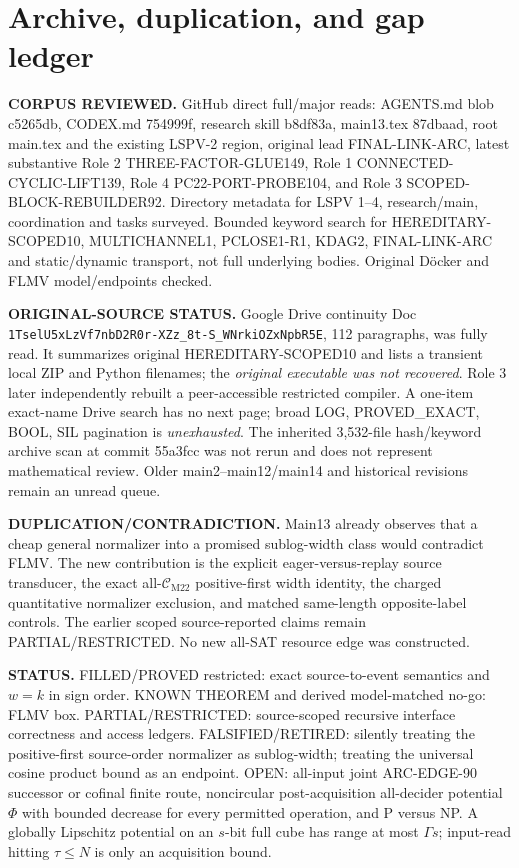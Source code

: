 \documentclass[11pt]{article}
\newcommand{\CM}{\mathcal C_{\mathrm{M22}}}
\begin{document}
\section{Archive, duplication, and gap ledger}
\noindent\textbf{CORPUS REVIEWED.} GitHub direct full/major reads: AGENTS.md blob c5265db, CODEX.md 754999f, research skill b8df83a, main13.tex 87dbaad, root main.tex and the existing LSPV-2 region, original lead FINAL-LINK-ARC, latest substantive Role 2 THREE-FACTOR-GLUE149, Role 1 CONNECTED-CYCLIC-LIFT139, Role 4 PC22-PORT-PROBE104, and Role 3 SCOPED-BLOCK-REBUILDER92. Directory metadata for LSPV 1--4, research/main, coordination and tasks surveyed. Bounded keyword search for HEREDITARY-SCOPED10, MULTICHANNEL1, PCLOSE1-R1, KDAG2, FINAL-LINK-ARC and static/dynamic transport, not full underlying bodies. Original D\"ocker and FLMV model/endpoints checked.

\noindent\textbf{ORIGINAL-SOURCE STATUS.} Google Drive continuity Doc \texttt{1TselU5xLzVf7nbD2R0r-XZz\_8t-S\_WNrkiOZxNpbR5E}, 112 paragraphs, was fully read. It summarizes original HEREDITARY-SCOPED10 and lists a transient local ZIP and Python filenames; the \emph{original executable was not recovered}. Role 3 later independently rebuilt a peer-accessible restricted compiler. A one-item exact-name Drive search has no next page; broad LOG, PROVED\_EXACT, BOOL, SIL pagination is \emph{unexhausted}. The inherited 3,532-file hash/keyword archive scan at commit 55a3fcc was not rerun and does not represent mathematical review. Older main2--main12/main14 and historical revisions remain an unread queue.

\noindent\textbf{DUPLICATION/CONTRADICTION.} Main13 already observes that a cheap general normalizer into a promised sublog-width class would contradict FLMV. The new contribution is the explicit eager-versus-replay source transducer, the exact all-$\CM$ positive-first width identity, the charged quantitative normalizer exclusion, and matched same-length opposite-label controls. The earlier scoped source-reported claims remain PARTIAL/RESTRICTED. No new all-SAT resource edge was constructed.

\noindent\textbf{STATUS.} FILLED/PROVED restricted: exact source-to-event semantics and $w=k$ in sign order. KNOWN THEOREM and derived model-matched no-go: FLMV box. PARTIAL/RESTRICTED: source-scoped recursive interface correctness and access ledgers. FALSIFIED/RETIRED: silently treating the positive-first source-order normalizer as sublog-width; treating the universal cosine product bound as an endpoint. OPEN: all-input joint ARC-EDGE-90 successor or cofinal finite route, noncircular post-acquisition all-decider potential $\Phi$ with bounded decrease for every permitted operation, and P versus NP. A globally Lipschitz potential on an $s$-bit full cube has range at most $\Gamma s$; input-read hitting $\tau\le N$ is only an acquisition bound.
\end{document}
